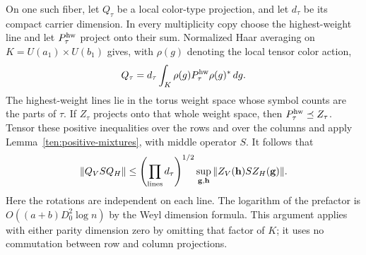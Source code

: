 On one such fiber, let $Q_\tau$ be a local color-type projection,
and let $d_\tau$ be its compact carrier dimension. In every
multiplicity copy choose the highest-weight line and let
$P_\tau^{\rm hw}$ project onto their sum. Normalized Haar averaging
on $K=U(a_1)\times U(b_1)$ gives, with $\rho(g)$ denoting the
local tensor color action,
\[
 Q_\tau=d_\tau\int_K
       \rho(g)P_\tau^{\rm hw}\rho(g)^*\,dg.
\]
The highest-weight lines lie in the torus weight space whose symbol
counts are the parts of $\tau$. If $Z_\tau$ projects onto that
whole weight space, then $P_\tau^{\rm hw}\preceq Z_\tau$. Tensor
these positive inequalities over the rows and over the columns and
apply Lemma~\ref{ten:positive-mixtures}, with middle operator $S$.
It follows that
\[
 \|Q_V S Q_H\|
 \le\left(\prod_{\rm lines}d_\tau\right)^{1/2}
      \sup_{\mathbf g,\mathbf h}
       \|Z_V(\mathbf h)S Z_H(\mathbf g)\|.
\]
Here the rotations are independent on each line. The logarithm of
the prefactor is $O((a+b)D_0^2\log n)$ by the Weyl dimension
formula. This argument applies with either parity dimension zero
by omitting that factor of $K$; it uses no commutation between row
and column projections.

